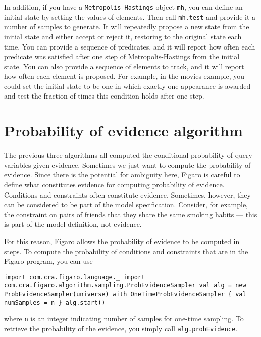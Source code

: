 In addition, if you have a \texttt{Metropolis-Hastings} object \texttt{mh}, you can define an initial state by setting the values of elements. Then call \texttt{mh.test} and provide it a number of samples to generate. It will repeatedly propose a new state from the initial state and either accept or reject it, restoring to the original state each time. You can provide a sequence of predicates, and it will report how often each predicate was satisfied after one step of Metropolis-Hastings from the initial state. You can also provide a sequence of elements to track, and it will report how often each element is proposed. For example, in the movies example, you could set the initial state to be one in which exactly one appearance is awarded and test the fraction of times this condition holds after one step.

\section{Probability of evidence algorithm}

The previous three algorithms all computed the conditional probability of query variables given evidence. Sometimes we just want to compute the probability of evidence. Since there is the potential for ambiguity here, Figaro is careful to define what constitutes evidence for computing probability of evidence. Conditions and constraints often constitute evidence. Sometimes, however, they can be considered to be part of the model specification. Consider, for example, the constraint on pairs of friends that they share the same smoking habits — this is part of the model definition, not evidence.

For this reason, Figaro allows the probability of evidence to be computed in steps. To compute the probability of conditions and constraints that are in the Figaro program, you can use

\begin{flushleft}
\texttt{import com.cra.figaro.language.\_
\newline \tab import com.cra.figaro.algorithm.sampling.ProbEvidenceSampler
\newline 
\newline val alg = new ProbEvidenceSampler(universe) with
\newline \tab OneTimeProbEvidenceSampler \{ val numSamples = n \}
\newline alg.start()
}
\end{flushleft}

where \texttt{n} is an integer indicating number of samples for one-time sampling. To retrieve the probability of the evidence, you simply call \texttt{alg.probEvidence}.

